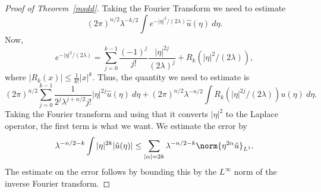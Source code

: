 \documentclass[12pt]{article}
\begin{document}
\begin{proof}[Proof of Theorem~\ref{msdd}]
Taking the Fourier Transform we need to estimate
\[(2\pi)^{n/2}\lambda^{-k/2}\int e^{-|\eta|^2/(2\lambda)}\hat{u}(\eta)\ d\eta.\]
Now, 
\[e^{-|\eta|^2/(2\lambda)} = \sum_{j=0}^{k-1} \frac{(-1)^j}{j!}\frac{|\eta|^{2j}}{(2\lambda)^j} + R_k(|\eta|^{2}/(2\lambda)),\]
where $|R_k(x)| \leq \frac{1}{k!} |x|^{k}$.
Thus, the quantity we need to estimate is
\[(2\pi)^{n/2}\sum_{j=0}^{k-1} \frac{1}{2^j\lambda^{j+n/2}j!}|\eta|^{2j}\hat{u}(\eta)\ d\eta + (2\pi)^{n/2}\lambda^{-n/2}\int R_k(|\eta|^{2j}/(2\lambda))u(\eta)\ d\eta.\]
Taking the Fourier transform and using that it converts $|\eta|^2$ to the Laplace operator, the first term is what we want. We estimate the error by
\[\lambda^{-n/2-k}\int |\eta|^{2k}|\hat{u}(\eta)| \leq \sum_{|\alpha| = 2k}\lambda^{-n/2-k}\norm{\eta^{2\alpha}\hat{u}}_{L^1}.\] The estimate on the error follows by bounding this by the $L^\infty$ norm of the inverse Fourier transform.\end{proof}
\end{document}
